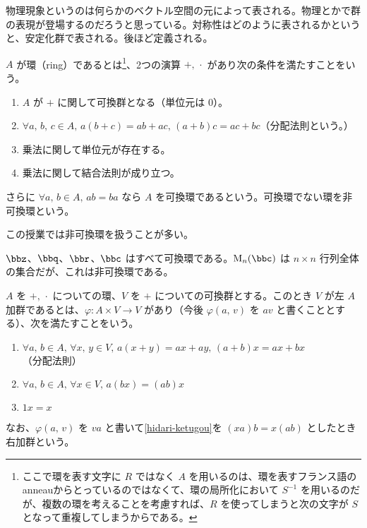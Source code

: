 \documentclass[a4paper]{ltjsarticle}
\begin{document}

物理現象というのは何らかのベクトル空間の元によって表される。物理とかで群の表現が登場するのだろうと思っている。対称性はどのように表されるかというと、安定化群で表される。後ほど定義される。

\begin{dfn}[環]
  $A$ が環（ring）であるとは\footnote{ここで環を表す文字に $R$ ではなく $A$ を用いるのは、環を表すフランス語のanneauからとっているのではなくて、環の局所化において $S^{-1}$ を用いるのだが、複数の環を考えることを考慮すれば、$R$ を使ってしまうと次の文字が $S$ となって重複してしまうからである。}、2つの演算 $+,\,\cdot$ があり次の条件を満たすことをいう。
  \begin{enumerate}
    \item $A$ が $+$ に関して可換群となる（単位元は $0$）。
    \item $\forall a,\,b,\,c\in A,\,a(b+c) = ab + ac,\,(a+b)c = ac + bc$（分配法則という。）
    \item 乗法に関して単位元が存在する。
    \item 乗法に関して結合法則が成り立つ。
  \end{enumerate}
  さらに $\forall a,\,b\in A,\,ab = ba$ なら $A$ を可換環であるという。可換環でない環を非可換環という。
\end{dfn}

この授業では非可換環を扱うことが多い。


\begin{exm}
  $\bbz$、$\bbq$、$\bbr$、$\bbc$ はすべて可換環である。$\M_n(\bbc)$ は $n\times n$ 行列全体の集合だが、これは非可換環である。
\end{exm}

\begin{dfn}[環上の加群]
  $A$ を $+,\,\cdot$ についての環、$V$ を $+$ についての可換群とする。このとき $V$ が左 $A$ 加群であるとは、$\varphi\colon A\times V\to V$ があり（今後 $\varphi(a,\,v)$ を $av$ と書くこととする）、次を満たすことをいう。
  \begin{enumerate}
    \item $\forall a,\,b\in A,\,\forall x,\,y\in V,\,a(x+y) = ax + ay,\,(a+b)x = ax + bx$（分配法則）
    \item $\forall a,\,b\in A,\,\forall x\in V,\,a(bx) = (ab)x$\label{hidari-ketugou}
    \item $1x = x$
  \end{enumerate}
  なお、$\varphi(a,\,v)$ を $va$ と書いて\cref{hidari-ketugou}を $(xa)b = x(ab)$ としたとき右加群という。
\end{dfn}
\end{document}

